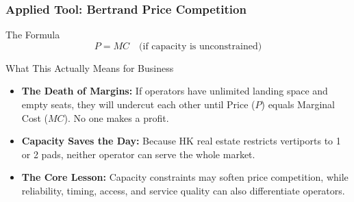 \documentclass{beamer}
\begin{document}
\begin{frame}[t, shrink=10]
  \frametitle{Applied Tool: Bertrand Price Competition}
  
  \begin{block}{The Formula}
  \begin{equation}
      P = MC \quad \text{(if capacity is unconstrained)}
  \end{equation}
  \end{block}

  \vspace{0.1cm}
  \begin{block}{What This Actually Means for Business}
  \begin{itemize}
    \item \textbf{The Death of Margins:} If operators have unlimited landing space and empty seats, they will undercut each other until Price ($P$) equals Marginal Cost ($MC$). No one makes a profit.
    \item \textbf{Capacity Saves the Day:} Because HK real estate restricts vertiports to 1 or 2 pads, neither operator can serve the whole market. 
    \item \textbf{The Core Lesson:} Capacity constraints may soften price competition, while reliability, timing, access, and service quality can also differentiate operators.
  \end{itemize}
  \end{block}
\end{frame}
\end{document}
